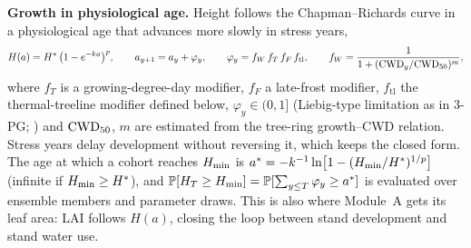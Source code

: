 \textbf{Growth in physiological age.} Height follows the Chapman--Richards curve in a physiological age that advances more slowly in stress years,
\begin{equation}\label{eq:cr}
H(a)=H^\ast\,\big(1-e^{-k a}\big)^{p},\qquad a_{y+1}=a_y+\varphi_y,\qquad \varphi_y=f_W\,f_T\,f_F\,f_{\text{tl}},\qquad f_W=\frac{1}{1+(\mathrm{CWD}_y/\mathrm{CWD}_{50})^{m}},
\end{equation}
where $f_T$ is a growing-degree-day modifier, $f_F$ a late-frost modifier, $f_{\text{tl}}$ the thermal-treeline modifier defined below, $\varphi_y\in(0,1]$ (Liebig-type limitation as in 3-PG; \citealt{Landsberg1997}) and $\mathrm{CWD}_{50}$, $m$ are estimated from the tree-ring growth--CWD relation. Stress years delay development without reversing it, which keeps the closed form. The age at which a cohort reaches $H_{\min}$ is $a^\ast=-k^{-1}\ln\!\big[1-(H_{\min}/H^\ast)^{1/p}\big]$ (infinite if $H_{\min}\ge H^\ast$), and $\mathbb{P}[H_T\ge H_{\min}]=\mathbb{P}[\sum_{y\le T}\varphi_y\ge a^\ast]$ is evaluated over ensemble members and parameter draws. This is also where Module~A gets its leaf area: LAI follows $H(a)$, closing the loop between stand development and stand water use.

